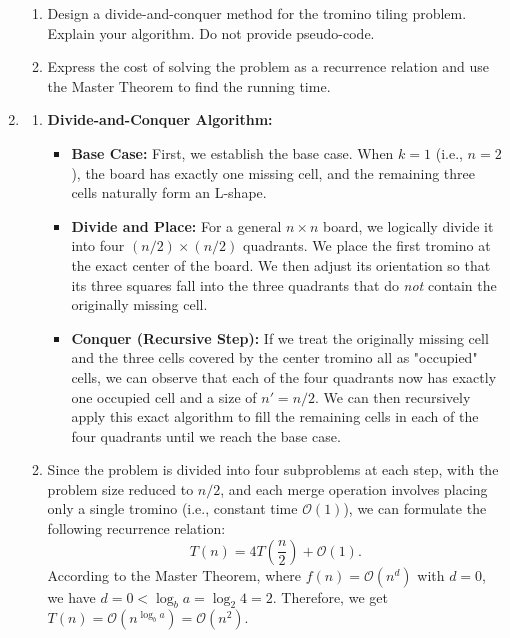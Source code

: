 \documentclass[12pt,a4paper]{article}
\makeatletter
\newtheorem*{solution}{Solution}
\theoremstyle{definition}
\renewenvironment{solution}[1][Solution] {\par\pushQED{\qed}\normalfont\topsep6\p@\@plus6\p@\relax\trivlist\item[\hskip\labelsep\bfseries#1\@addpunct{.}]\ignorespaces}{\popQED\endtrivlist\@endpefalse} \makeatother
\makeatother
\begin{document}
\begin{enumerate}
    \begin{enumerate}
        \item Design a divide-and-conquer method for the tromino tiling problem. Explain your algorithm. Do not provide pseudo-code.

        {\color{red}{(HINT: Place the first tromino at the center of board)}}

        \item Express the cost of solving the problem as a recurrence relation and use the Master Theorem to find the running time.
    \end{enumerate}
    \begin{solution}
        \begin{enumerate}
            \item \textbf{Divide-and-Conquer Algorithm:}
            \begin{itemize}
                \item \textbf{Base Case:} First, we establish the base case. When $k = 1$ (i.e., $n = 2$), the board has exactly one missing cell, and the remaining three cells naturally form an L-shape.
                \item \textbf{Divide and Place:} For a general $n \times n$ board, we logically divide it into four $(n/2) \times (n/2)$ quadrants. We place the first tromino at the exact center of the board. We then adjust its orientation so that its three squares fall into the three quadrants that do \textit{not} contain the originally missing cell. 
                \item \textbf{Conquer (Recursive Step):} If we treat the originally missing cell and the three cells covered by the center tromino all as "occupied" cells, we can observe that each of the four quadrants now has exactly one occupied cell and a size of $n' = n/2$. We can then recursively apply this exact algorithm to fill the remaining cells in each of the four quadrants until we reach the base case.
            \end{itemize}
            \item Since the problem is divided into four subproblems at each step, with the problem size reduced to $n/2$, and each merge operation involves placing only a single tromino (i.e., constant time $\mathcal{O}(1)$), we can formulate the following recurrence relation:
                \[
                    T(n) = 4T\left(\frac{n}{2}\right) + \mathcal{O}(1).
                \]
            According to the Master Theorem, where $f(n) = \mathcal{O}(n^d)$ with $d = 0$, we have $d = 0 < \log_b a = \log_2 4 = 2$. Therefore, we get $T(n) = \mathcal{O}(n^{\log_b a}) = \mathcal{O}(n^2)$.
        \end{enumerate}
    \end{solution}


    
\end{enumerate}






\end{document}
